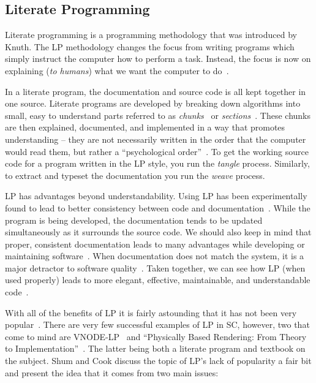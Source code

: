 \documentclass[preprint, 10pt]{sigplanconf}
\begin{document}
\subsection{Literate Programming}
\label{subsec:lp}

Literate programming is a programming methodology that was introduced by Knuth.
The LP methodology changes the focus from writing programs which simply instruct
the computer how to perform a task. Instead, the focus is now on explaining
(\emph{to humans}) what we want the computer to do~\cite{Knuth1984}.

In a literate program, the documentation and source code is all kept together in
one source. Literate programs are developed by breaking down algorithms into
small, easy to understand parts referred to as
\emph{chunks}~\cite{JohnsonAndJohnson1997} or \emph{sections}~\cite{Knuth1984}.
These chunks are then explained, documented, and implemented in a way that
promotes understanding -- they are not necessarily written in the order that the
computer would read them, but rather a ``psychological
order''~\cite{PieterseKourieAndBoake2004}. To get the working source code for a
program written in the LP style, you run the \emph{tangle} process. Similarly,
to extract and typeset the documentation you run the \emph{weave} process.

LP has advantages beyond understandability. Using LP has been experimentally
found to lead to better consistency between code and
documentation~\cite{ShumAndCook1993}. While the program is being developed, the
documentation tends to be updated simultaneously as it surrounds the source
code. We should also keep in mind that proper, consistent documentation leads to
many advantages while developing or maintaining software~\cite{Heyman1990,
Kotula2000}. When documentation does not match the system, it is a major
detractor to software quality~\cite{Kotula2000, Thimbleby1986}. Taken together,
we can see how LP (when used properly) leads to more elegant, effective,
maintainable, and understandable code~\cite{PieterseKourieAndBoake2004}.

With all of the benefits of LP it is fairly astounding that it has not been very
popular~\cite{ShumAndCook1993}. There are very few successful examples of LP in
SC, however, two that come to mind are VNODE-LP~\cite{Nedialkov2006} and
``Physically Based Rendering: From Theory to
Implementation''~\cite{PharrAndHumphreys2004}. The latter being both a literate
program and textbook on the subject. Shum and Cook discuss the topic of LP's
lack of popularity a fair bit and present the idea that it comes from two main
issues:
\end{document}
